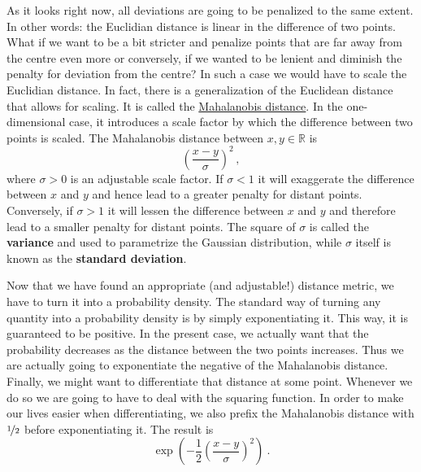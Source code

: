 \documentclass[a4paper,11pt,leqno]{report}\usepackage[]{graphicx}\usepackage[]{color}
\begin{document}
As it looks right now, all deviations are going to be penalized to the same extent. In other words: the Euclidian distance is linear in the difference of two points.
What if we want to be a bit stricter and penalize points that are far away from the centre even more or conversely, if we wanted to be lenient and diminish the penalty
for deviation from the centre? In such a case we would have to scale the Euclidian distance. In fact, there is a generalization of the Euclidean distance that
allows for scaling. It is called the \href{https://en.wikipedia.org/wiki/Mahalanobis_distance}{Mahalanobis distance}. In the one-dimensional case, it introduces
a scale factor by which the difference between two points is scaled. The Mahalanobis distance between $ x,y \in \mathbb{R} $ is 
\begin{equation*}
\left(\frac{x - y}{\sigma}\right)^{2} \, ,
\end{equation*}
where $ \sigma > 0 $ is an adjustable scale factor. If $ \sigma < 1 $ it will exaggerate the difference between $ x $ and $ y $ and hence lead to a greater
penalty for distant points. Conversely, if $ \sigma > 1 $ it will lessen the difference between $ x $ and $ y $ and therefore lead to a smaller penalty for 
distant points. The square of $ \sigma $ is called the \textbf{variance} and used to parametrize the Gaussian distribution, while $ \sigma $ itself is 
known as the \textbf{standard deviation}.

Now that we have found an appropriate (and adjustable!) distance metric, we have to turn it into a probability density. The standard way of turning any quantity
into a probability density is by simply exponentiating it. This way, it is guaranteed to be positive. In the present case, we actually want that the probability
decreases as the distance between the two points increases. Thus we are actually going to exponentiate the negative of the Mahalanobis distance. Finally, we
might want to differentiate that distance at some point. Whenever we do so we are going to have to deal with the squaring function. In order to make our lives
easier when differentiating, we also prefix the Mahalanobis distance with $ \nicefrac{1}{2} $ before exponentiating it. The result is
\begin{equation}
\exp\left(-\frac{1}{2} \left(\frac{x - y}{\sigma}\right)^{2} \right) \ .
\end{equation}
\end{document}
